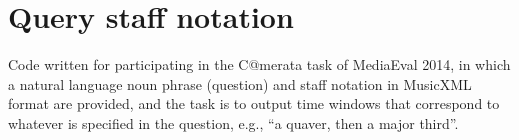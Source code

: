 \section{Query staff notation}\label{sec:query-staff-notation}

Code written for participating in the C@merata task of MediaEval 2014, in which a natural language noun phrase (question) and staff notation in MusicXML format are provided, and the task is to output time windows that correspond to whatever is specified in the question, e.g., ``a quaver, then a major third''.


